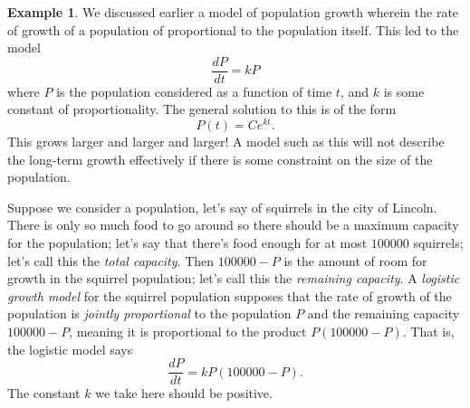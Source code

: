 \documentclass[12pt]{amsart}
\numberwithin{equation}{section}
\theoremstyle{plain} %
\theoremstyle{definition}
\newtheorem{ex}[equation]{Example}
\theoremstyle{remark}
\begin{document}
\begin{ex} We discussed earlier a model of population growth wherein the rate of growth of a population of proportional to the population itself. This led to the model
\[ \frac{dP}{dt} = k P\]
where $P$ is the population considered as a function of time $t$, and $k$ is some constant of proportionality. The general solution to this is of the form
\[ P(t) = C e^{kt}.\]
This grows larger and larger and larger! A model such as this will not describe the long-term growth effectively if there is some constraint on the size of the population.

Suppose we consider a population, let's say of squirrels in the city of Lincoln. There is only so much food to go around so there should be a maximum capacity for the population; let's say that there's food enough for at most $100000$ squirrels; let's call this the \emph{total capacity}. Then $100000-P$ is the amount of room for growth in the squirrel population; let's call this the \emph{remaining capacity}. A \emph{logistic growth model} for the squirrel population supposes that the rate of growth of the population is \emph{jointly proportional} to the population $P$ and the remaining capacity $100000-P$, meaning it is proportional to the product $P (100000-P)$. That is, the logistic model says
\[ \frac{dP}{dt} = k  P (100000-P).\]
The constant $k$ we take here should be positive.
\end{ex}
\end{document}
